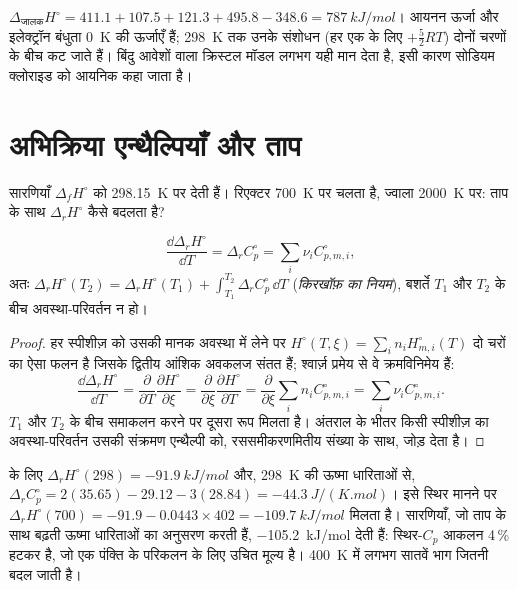 \begin{example}[सोडियम क्लोराइड]\label{ex:b2:reaction-enthalpy:nacl}
$\Delta_{\text{जालक}}H^\circ = 411.1 + 107.5 + 121.3 + 495.8 - 348.6 =
\qty{787}{kJ/mol}$। आयनन ऊर्जा और इलेक्ट्रॉन बंधुता
\qty{0}{K} की ऊर्जाएँ हैं; \qty{298}{K} तक उनके संशोधन (हर एक के लिए $+\tfrac52RT$)
दोनों चरणों के बीच कट जाते हैं। बिंदु आवेशों वाला क्रिस्टल मॉडल
लगभग यही मान देता है, इसी कारण सोडियम क्लोराइड को आयनिक कहा जाता है।
\end{example}

\section{अभिक्रिया एन्थैल्पियाँ और ताप}

सारणियाँ $\Delta_f H^\circ$ को \qty{298.15}{K} पर देती हैं। रिएक्टर
\qty{700}{K} पर चलता है, ज्वाला \qty{2000}{K} पर: ताप के साथ
$\Delta_r H^\circ$ कैसे बदलता है?

\begin{theorem}[किरखॉफ़ का नियम]\label{thm:b2:reaction-enthalpy:kirchhoff}
\[
  \frac{\dd\Delta_r H^\circ}{\dd T} = \Delta_r C_p^\circ =
  \sum_i\nu_i C_{p,m,i}^\circ ,
\]
अतः $\Delta_r H^\circ(T_2) = \Delta_r H^\circ(T_1) + \int_{T_1}^{T_2}
\Delta_r C_p^\circ\,\dd T$ (\emph{किरखॉफ़ का नियम}),
बशर्ते $T_1$ और $T_2$ के बीच अवस्था-परिवर्तन न हो।
\end{theorem}

\begin{proof}
हर स्पीशीज़ को उसकी मानक अवस्था में लेने पर $H^\circ(T, \xi) = \sum_in_i
H^\circ_{m,i}(T)$ दो चरों का ऐसा फलन है जिसके द्वितीय आंशिक
अवकलज संतत हैं; श्वार्ज़ प्रमेय से वे क्रमविनिमेय हैं:
\[
  \frac{\dd\Delta_r H^\circ}{\dd T} = \frac{\partial}{\partial T}
  \frac{\partial H^\circ}{\partial\xi} = \frac{\partial}{\partial\xi}
  \frac{\partial H^\circ}{\partial T} = \frac{\partial}{\partial\xi}
  \sum_in_iC^\circ_{p,m,i} = \sum_i\nu_iC^\circ_{p,m,i}.
\]
$T_1$ और $T_2$ के बीच समाकलन करने पर दूसरा रूप मिलता है। अंतराल के भीतर
किसी स्पीशीज़ का अवस्था-परिवर्तन उसकी संक्रमण एन्थैल्पी को, रससमीकरणमितीय
संख्या के साथ, जोड़ देता है।
\end{proof}

\begin{example}[गर्म अवस्था में अमोनिया संश्लेषण]\label{ex:b2:reaction-enthalpy:kirchhoff}
 के लिए $\Delta_r H^\circ(298) =
\qty{-91.9}{kJ/mol}$ और, \qty{298}{K} की ऊष्मा धारिताओं से,
$\Delta_r C_p^\circ = 2(35.65) - 29.12 - 3(28.84) =
\qty{-44.3}{J/(K.mol)}$। इसे स्थिर मानने पर $\Delta_r
H^\circ(700) = -91.9 - 0.0443 \times 402 = \qty{-109.7}{kJ/mol}$ मिलता है। सारणियाँ,
जो ताप के साथ बढ़ती ऊष्मा धारिताओं का अनुसरण करती हैं,
\qty{-105.2}{kJ/mol} देती हैं: स्थिर-$C_p$ आकलन 4\,\% हटकर है, जो
एक पंक्ति के परिकलन के लिए उचित मूल्य है। \qty{400}{K} में  लगभग सातवें भाग जितनी बदल जाती है।
\end{example}

